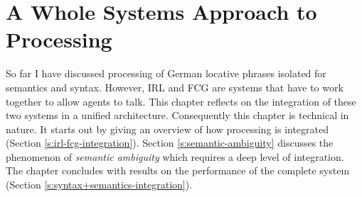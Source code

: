 %


\chapter{A Whole Systems Approach to Processing}
\label{s:german-locative-phrases-syntax-semantics-integration}
So far I have discussed processing of German locative phrases
isolated for semantics and syntax. However, IRL and FCG are systems that 
have to work together to allow agents to talk. This chapter reflects on the 
integration of these two systems in a unified architecture. 
Consequently this chapter is technical in nature. It starts out by giving
an overview of how processing is integrated (Section \ref{s:irl-fcg-integration}).
Section \ref{s:semantic-ambiguity} discusses the phenomenon of 
\emph{semantic ambiguity} which requires a deep level of integration.
The chapter concludes with results on the performance of the 
complete system (Section \ref{s:syntax+semantics-integration}).


